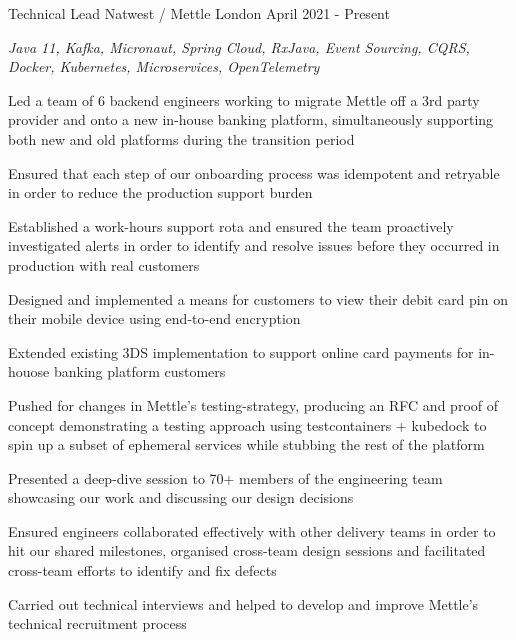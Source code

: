 

\begin{cventries}


  \cventry
    {Technical Lead} %
    {Natwest / Mettle} %
    {London} %
    {April 2021 - Present} %
    {
      \begin{cvitems} %
        \item {\itshape{Java 11, Kafka, Micronaut, Spring Cloud, RxJava, Event Sourcing, CQRS, Docker, Kubernetes, Microservices, OpenTelemetry}}
        \item {Led a team of 6 backend engineers working to migrate Mettle off a 3rd party provider and onto a new in-house banking platform, simultaneously supporting both new and old platforms during the transition period}        
        \item {Ensured that each step of our onboarding process was idempotent and retryable in order to reduce the production support burden}
        \item {Established a work-hours support rota and ensured the team proactively investigated alerts in order to identify and resolve issues before they occurred in production with real customers}
        \item {Designed and implemented a means for customers to view their debit card pin on their mobile device using end-to-end encryption}
        \item {Extended existing 3DS implementation to support online card payments for in-houose banking platform customers}
        \item {Pushed for changes in Mettle's testing-strategy, producing an RFC and proof of concept demonstrating a testing approach using testcontainers + kubedock to spin up a subset of ephemeral services while stubbing the rest of the platform}
        \item {Presented a deep-dive session to 70+ members of the engineering team showcasing our work and discussing our design decisions}
        \item {Ensured engineers collaborated effectively with other delivery teams in order to hit our shared milestones, organised cross-team design sessions and facilitated cross-team efforts to identify and fix defects}
        \item {Carried out technical interviews and helped to develop and improve Mettle's technical recruitment process}
      \end{cvitems} 
    }


\end{cventries}
